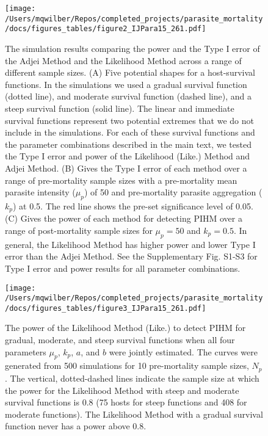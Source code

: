 \documentclass[12pt, a4paper]{article}
\begin{document}
\begin{figure}
\texttt{[image: /Users/mqwilber/Repos/completed\_projects/parasite\_mortality/docs/figures\_tables/figure2\_IJPara15\_261.pdf]}
\caption{The simulation results comparing the power and the Type I error of the Adjei Method and the Likelihood Method across a range of different sample sizes. (A) Five potential shapes for a host-survival functions. In the simulations we used a gradual survival function (dotted line), and moderate survival function (dashed line), and a steep survival function (solid line). The linear and immediate survival functions represent two potential extremes that we do not include in the simulations. For each of these survival functions and the parameter combinations described in the main text, we tested the Type I error and power of the Likelihood (Like.) Method and Adjei Method. (B) Gives the Type I error of each method over a range of pre-mortality sample sizes with a pre-mortality mean parasite intensity ($\mu_p$) of 50 and pre-mortality parasite aggregation ($k_p$) at 0.5. The red line shows the pre-set significance level of 0.05. (C) Gives the power of each method for detecting PIHM over a range of post-mortality sample sizes for $\mu_p = 50$ and $k_p = 0.5$.  In general, the Likelihood Method has higher power and lower Type I error than the Adjei Method.  See the Supplementary Fig. S1-S3 for Type I error and power results for all parameter combinations.}
\end{figure}




\begin{figure}
    \texttt{[image: /Users/mqwilber/Repos/completed\_projects/parasite\_mortality/docs/figures\_tables/figure3\_IJPara15\_261.pdf]}
    \caption{The power of the Likelihood Method (Like.) to detect PIHM for gradual, moderate, and steep survival functions when all four parameters $\mu_p$, $k_p$, $a$, and $b$ were jointly estimated. The curves were generated from 500 simulations for 10 pre-mortality sample sizes, $N_p$. The vertical, dotted-dashed lines indicate the sample size at which the power for the Likelihood Method with steep and moderate survival functions is 0.8 (75 hosts for steep functions and 408 for moderate functions). The Likelihood Method with a gradual survival function never has a power above 0.8.}
\end{figure}
\end{document}
